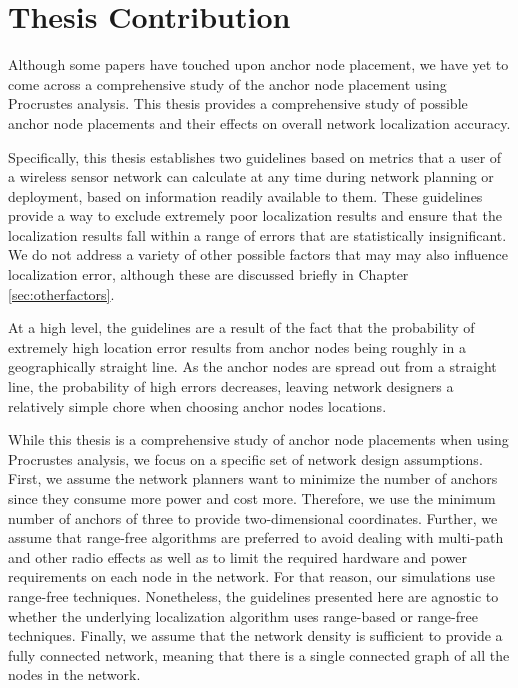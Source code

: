 \section{Thesis Contribution}
Although some papers have touched upon anchor node placement, we have yet to come across a comprehensive study of the anchor node placement using Procrustes analysis.  This thesis provides a comprehensive study of possible anchor node placements and their effects on overall network localization accuracy.

Specifically, this thesis establishes two guidelines based on metrics that a user of a wireless sensor network can calculate at any time during network planning or deployment, based on information readily available to them.  These guidelines provide a way to exclude extremely poor localization results and ensure that the localization results fall within a range of errors that are statistically insignificant.  We do not address a variety of other possible factors that may may also influence localization error, although these are discussed briefly in Chapter \ref{sec:otherfactors}.

At a high level, the guidelines are a result of the fact that the probability of extremely high location error results from anchor nodes being roughly in a geographically straight line.  As the anchor nodes are spread out from a straight line, the probability of high errors decreases, leaving network designers a relatively simple chore when choosing anchor nodes locations.

While this thesis is a comprehensive study of anchor node placements when using Procrustes analysis, we focus on a specific set of network design assumptions.  First, we assume the network planners want to minimize the number of anchors since they consume more power and cost more.  Therefore, we use the minimum number of anchors of three to provide two-dimensional coordinates. Further, we assume that range-free algorithms are preferred to avoid dealing with multi-path and other radio effects as well as to limit the required hardware and power requirements on each node in the network.  For that reason, our simulations use range-free techniques.  Nonetheless, the guidelines presented here are agnostic to whether the underlying localization algorithm uses range-based or range-free techniques. Finally, we assume that the network density is sufficient to provide a fully connected network, meaning that there is a single connected graph of all the nodes in the network.

